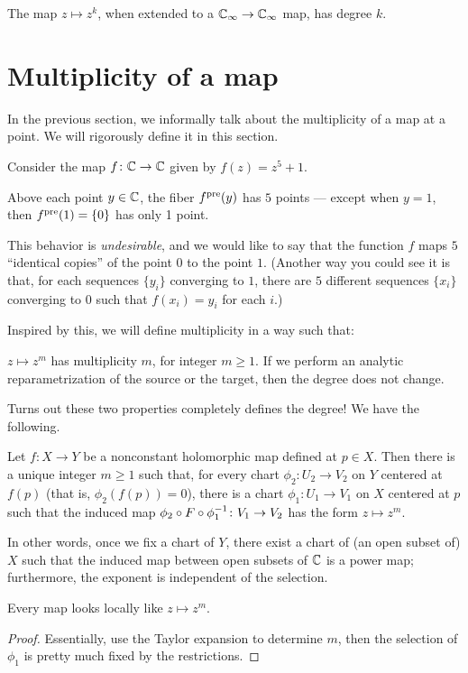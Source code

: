 \begin{example}
	The map $z \mapsto z^k$, when extended to a $\mathbb C_\infty \to \mathbb C_\infty$ map, has degree $k$.
\end{example}

\section{Multiplicity of a map}

In the previous section, we informally talk about the multiplicity of a map at a point. We will
rigorously define it in this section.

\begin{example}
	Consider the map $f \colon \mathbb C \to \mathbb C$ given by $f(z) = z^5 + 1$.

	Above each point $y \in \mathbb C$, the fiber $f^{\text{pre}}(y)$ has $5$ points --- except when $y = 1$, then
	$f^{\text{pre}}(1) = \{ 0 \}$ has only 1 point.
\end{example}

This behavior is \emph{undesirable}, and we would like to say that the function $f$ maps $5$
``identical copies'' of the point $0$ to the point $1$.
(Another way you could see it is that, for each sequences $\{ y_i \}$ converging to $1$, there are
$5$ different sequences $\{ x_i \}$ converging to $0$ such that $f(x_i) = y_i$ for each $i$.)

Inspired by this, we will define multiplicity in a way such that:
\begin{itemize}
	\ii $z \mapsto z^m$ has multiplicity $m$, for integer $m \geq 1$.
	\ii If we perform an analytic reparametrization of the source or the target, then the degree
	does not change.
\end{itemize}
Turns out these two properties completely defines the degree! We have the following.
\begin{proposition}
	Let $f \colon X \to Y$ be a nonconstant holomorphic map defined at $p \in X$.
	Then there is a unique integer $m \geq 1$ such that, for every chart $\phi_2 \colon U_2 \to V_2$
	on $Y$ centered at $f(p)$ (that is, $\phi_2(f(p)) = 0$),
	there is a chart $\phi_1 \colon U_1 \to V_1$ on $X$ centered at $p$
	such that the induced map $\phi_2 \circ F \circ \phi_1^{-1} \colon V_1 \to V_2$
	has the form $z \mapsto z^m$.
\end{proposition}
In other words, once we fix a chart of $Y$, there exist a chart of (an open subset of) $X$
such that the induced map between open subsets of $\mathbb C$ is a power map;
furthermore, the exponent is independent of the selection.
\begin{moral}
	Every map looks locally like $z \mapsto z^m$.
\end{moral}
\begin{proof}
	Essentially, use the Taylor expansion to determine $m$, then the selection of $\phi_1$ is pretty
	much fixed by the restrictions.
\end{proof}

